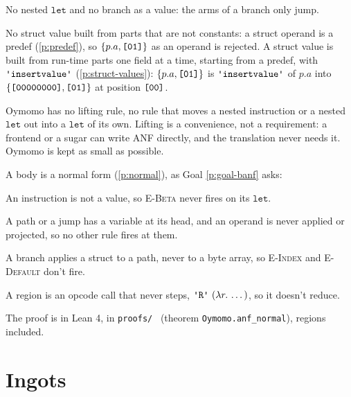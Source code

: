 \documentclass[11pt,letterpaper]{article}
\newcommand{\lam}[2]{\lambda #1.\,#2}       %
\newcommand{\rn}[1]{\textsc{#1}}                %
\newcommand{\kw}[1]{\mathtt{#1}}
\newcommand{\str}[1]{\text{\ttfamily\textquotesingle #1\textquotesingle}}  %
\newcommand{\hex}[1]{\text{\ttfamily [#1]}}  %
\newcounter{pt}
\newcommand{\pref}[1]{\ref{#1}}  %
\begin{document}
\begin{points}
\begin{subpoints}
  \item No nested $\kw{let}$ and no branch as a value: the arms of a branch only jump.
  \item No struct value built from parts that are not constants: a struct operand is a predef (\pref{p:predef}), so $\{p.a, \hex{01}\}$ as an operand is rejected. A struct value is built from run-time parts one
    field at a time, starting from a predef, with $\str{insertvalue}$ (\pref{p:struct-values}):
    $\{p.a, \hex{01}\}$ is $\str{insertvalue}$ of $p.a$ into $\{\hex{00000000}, \hex{01}\}$ at position $\hex{00}$.
  \item Oymomo has no lifting rule, no rule that moves a nested instruction or a nested $\kw{let}$ out into
    a $\kw{let}$ of its own. Lifting is a convenience, not a requirement: a frontend or a sugar can write ANF
    directly, and the translation never needs it. Oymomo is kept as small as possible.
  \end{subpoints}
\item\label{p:anf-normal} A body is a normal form (\pref{p:normal}), as Goal \pref{p:goal-banf} asks:
  \begin{subpoints}
  \item An instruction is not a value, so \rn{E-Beta} never fires on its $\kw{let}$.
  \item A path or a jump has a variable at its head, and an operand is never applied or projected, so no
    other rule fires at them.
  \item A branch applies a struct to a path, never to a byte array, so \rn{E-Index} and \rn{E-Default} don't fire.
  \item A region is an opcode call that never steps, $\str{R}\ (\lam{r}{\dots})$, so it doesn't reduce.
  \item The proof is in Lean 4, in \texttt{proofs/}~\cite{oymoproofs} (theorem \texttt{Oymomo.anf\_normal}), regions included.
  \end{subpoints}
\end{points}


\section{Ingots}\label{sec:modules}
\end{document}
